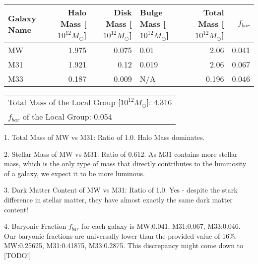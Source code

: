 \documentclass{article}
\begin{document}
 
\begin{tabular}{lrrlrr}
\hline
 Galaxy Name   &   Halo Mass [$10^{12} M_\odot$] &   Disk Mass [$10^{12} M_\odot$] & Bulge Mass [$10^{12} M_\odot$]   &   Total Mass [$10^{12} M_\odot$] &   $f_{bar}$ \\
\hline
 MW            &                           1.975 &                           0.075 & 0.01                             &                            2.06  &       0.041 \\
 M31           &                           1.921 &                           0.12  & 0.019                            &                            2.06  &       0.067 \\
 M33           &                           0.187 &                           0.009 & N/A                              &                            0.196 &       0.046 \\
\hline
\end{tabular}

\begin{tabular}{l}
\hline
 Total Mass of the Local Group [$10^{12} M_\odot$]: 4.316 \\
 $f_{bar}$ of the Local Group: 0.054                      \\
\hline
\end{tabular}

 1. Total Mass of MW vs M31: Ratio of 1.0. Halo Mass dominates.

 2. Stellar Mass of MW vs M31: Ratio of 0.612. As M31 contains more stellar mass, which is the only type of mass that directly contributes to the luminosity of a galaxy, we expect it to be more luminous.

 3. Dark Matter Content of MW vs M31: Ratio of 1.0. Yes - despite the stark difference in stellar matter, they have almost exactly the same dark matter content!

 4. Baryonic Fraction $f_{bar}$ for each galaxy is MW:0.041, M31:0.067, M33:0.046. Our baryonic fractions are universally lower than the provided value of 16\%. MW:0.25625, M31:0.41875, M33:0.2875. This discrepancy might come down to [TODO!]
 
\end{document}
